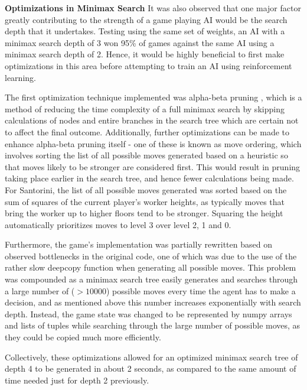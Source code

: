 \documentclass[a4paper,12pt,table]{article}
\begin{document}
\textbf{Optimizations in Minimax Search}
\newline
It was also observed that one major factor greatly contributing to the strength of a game playing AI would be the search depth that it undertakes. Testing using the same set of weights, an AI with a minimax search depth of 3 won 95\% of games against the same AI using a minimax search depth of 2. Hence, it would be highly beneficial to first make optimizations in this area before attempting to train an AI using reinforcement learning. \par

The first optimization technique implemented was alpha-beta pruning \cite{Artificial Intelligence: A Modern Approach}, which is a method of reducing the time complexity of a full minimax search by skipping calculations of nodes and entire branches in the search tree which are certain not to affect the final outcome. Additionally, further optimizations can be made to enhance alpha-beta pruning itself - one of these is known as move ordering, which involves sorting the list of all possible moves generated based on a heuristic so that moves likely to be stronger are considered first. This would result in pruning taking place earlier in the search tree, and hence fewer calculations being made. For Santorini, the list of all possible moves generated was sorted based on the sum of squares of the current player’s worker heights, as typically moves that bring the worker up to higher floors tend to be stronger. Squaring the height automatically prioritizes moves to level 3 over level 2, 1 and 0. \par

Furthermore, the game’s implementation was partially rewritten based on observed bottlenecks in the original code, one of which was due to the use of the rather slow deepcopy function when generating all possible moves. This problem was compounded as a minimax search tree easily generates and searches through a large number of ($>10000$) possible moves every time the agent has to make a decision, and as mentioned above this number increases exponentially with search depth. Instead, the game state was changed to be represented by numpy arrays and lists of tuples while searching through the large number of possible moves, as they could be copied much more efficiently. \par

Collectively, these optimizations allowed for an optimized minimax search tree of depth 4 to be generated in about 2 seconds, as compared to the same amount of time needed just for depth 2 previously. \par
\end{document}
